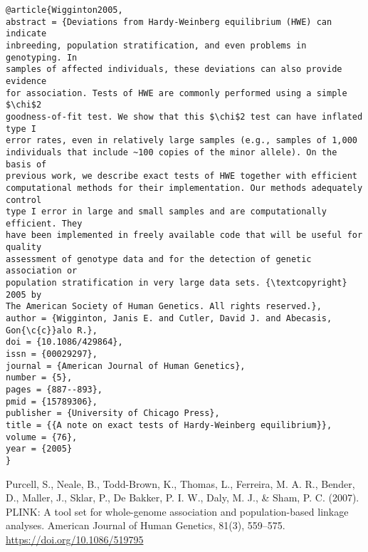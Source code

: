 \documentclass[]{article}
\begin{document}
\begin{verbatim}
@article{Wigginton2005,
abstract = {Deviations from Hardy-Weinberg equilibrium (HWE) can indicate
inbreeding, population stratification, and even problems in genotyping. In
samples of affected individuals, these deviations can also provide evidence
for association. Tests of HWE are commonly performed using a simple $\chi$2
goodness-of-fit test. We show that this $\chi$2 test can have inflated type I
error rates, even in relatively large samples (e.g., samples of 1,000
individuals that include ~100 copies of the minor allele). On the basis of
previous work, we describe exact tests of HWE together with efficient
computational methods for their implementation. Our methods adequately control
type I error in large and small samples and are computationally efficient. They
have been implemented in freely available code that will be useful for quality
assessment of genotype data and for the detection of genetic association or
population stratification in very large data sets. {\textcopyright} 2005 by
The American Society of Human Genetics. All rights reserved.},
author = {Wigginton, Janis E. and Cutler, David J. and Abecasis,
Gon{\c{c}}alo R.},
doi = {10.1086/429864},
issn = {00029297},
journal = {American Journal of Human Genetics},
number = {5},
pages = {887--893},
pmid = {15789306},
publisher = {University of Chicago Press},
title = {{A note on exact tests of Hardy-Weinberg equilibrium}},
volume = {76},
year = {2005}
}
\end{verbatim}

Purcell, S., Neale, B., Todd-Brown, K., Thomas, L., Ferreira, M. A. R., Bender, D., Maller, J., Sklar, P., De Bakker, P. I. W., Daly, M. J., \& Sham, P. C. (2007). PLINK: A tool set for whole-genome association and population-based linkage analyses. American Journal of Human Genetics, 81(3), 559–575. \url{https://doi.org/10.1086/519795}
\end{document}
